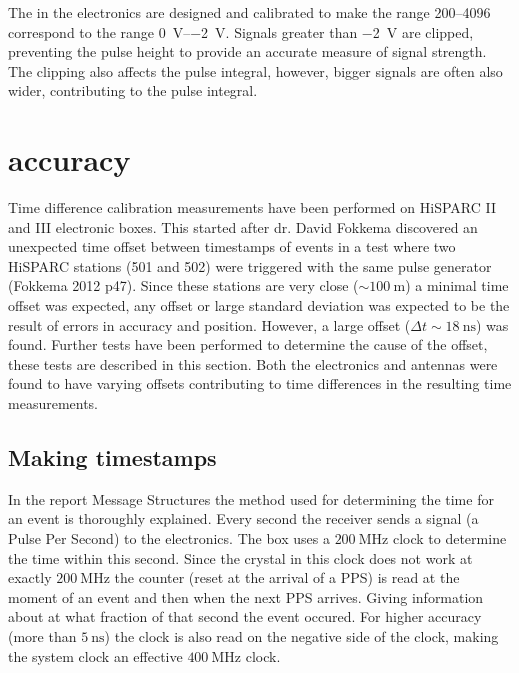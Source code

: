 The \adcs in the \hisparc electronics are designed and calibrated to
make the range \SIrange{200}{4096}{\adc} correspond to the range
\SIrange{0}{-2}{\volt}. Signals greater than \SI{-2}{\volt} are clipped,
preventing the pulse height to provide an accurate measure of signal
strength. The clipping also affects the pulse integral, however, bigger
signals are often also wider, contributing to the pulse integral.



\section{\gps accuracy}
\label{sec:gps_accuracy}

Time difference calibration measurements have been performed on
HiSPARC II and III electronic boxes. This started after dr. David
Fokkema discovered an unexpected time offset between timestamps of
events in a test where two HiSPARC stations (501 and 502) were triggered
with the same pulse generator (Fokkema 2012 p47). Since these stations
are very close ($\sim\SI{100}{\meter}$) a minimal time offset was
expected, any offset or large standard deviation was expected to be the
result of errors in \gps accuracy and position. However, a large offset
($\Delta t \sim\SI{18}{\nano\second}$) was found. Further tests have
been performed to determine the cause of the offset, these tests are
described in this section. Both the \hisparc electronics and \gps
antennas were found to have varying offsets contributing to time
differences in the resulting time measurements.


\subsection{Making timestamps}
\label{sub:gps_timestamps}

In the report Message Structures \hisparc the method used for
determining the time for an event is thoroughly explained. Every second
the \gps receiver sends a signal (a Pulse Per Second) to the \hisparc
electronics. The \hisparc box uses a $\SI{200}{\mega\hertz}$ clock to
determine the time within this second. Since the crystal in this clock
does not work at exactly $\SI{200}{\mega\hertz}$ the counter (reset at
the arrival of a PPS) is read at the moment of an event and then when
the next PPS arrives. Giving information about at what fraction of that
second the event occured. For higher accuracy (more than
$\SI{5}{\nano\second}$) the clock is also read on the negative side of
the clock, making the system clock an effective
$\SI{400}{\mega\hertz}$ clock.

